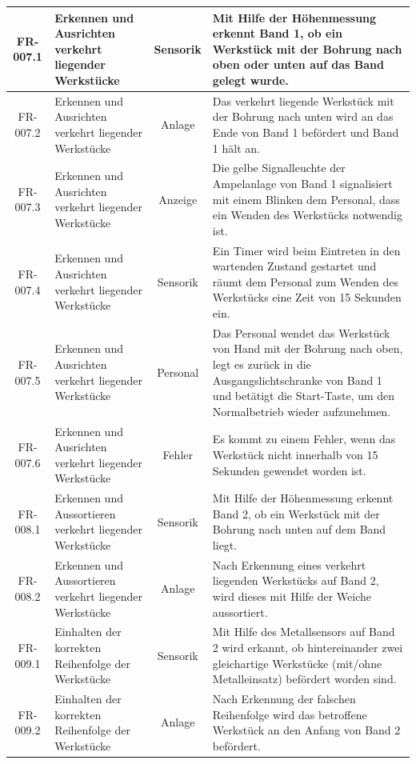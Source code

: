 \documentclass[oneside,a4paper,titlepage]{scrartcl}              %
\begin{document}
\begin{small}
\begin{center}
\begin{longtable}{|c|p{4cm}|c|p{7cm}|}
      \hline
      FR-007.1 & Erkennen und Ausrichten verkehrt liegender Werkstücke & Sensorik & Mit Hilfe der Höhenmessung erkennt Band 1, ob ein Werkstück mit der Bohrung nach oben oder unten auf das Band gelegt wurde.\\
      \hline
      FR-007.2 & Erkennen und Ausrichten verkehrt liegender Werkstücke & Anlage & Das verkehrt liegende Werkstück mit der Bohrung nach unten wird an das Ende von Band 1 befördert und Band 1 hält an.\\
      \hline
      FR-007.3 & Erkennen und Ausrichten verkehrt liegender Werkstücke & Anzeige & Die gelbe Signalleuchte der Ampelanlage von Band 1 signalisiert mit einem Blinken dem Personal, dass ein Wenden des Werkstücks notwendig ist.\\
      \hline
      FR-007.4 & Erkennen und Ausrichten verkehrt liegender Werkstücke & Sensorik & Ein Timer wird beim Eintreten in den wartenden Zustand gestartet und räumt dem Personal zum Wenden des Werkstücks eine Zeit von 15 Sekunden ein.\\
      \hline
      FR-007.5 & Erkennen und Ausrichten verkehrt liegender Werkstücke & Personal & Das Personal wendet das Werkstück von Hand mit der Bohrung nach oben, legt es zurück in die Ausgangslichtschranke von Band 1 und betätigt die Start-Taste, um den Normalbetrieb wieder aufzunehmen.\\
      \hline
      FR-007.6 & Erkennen und Ausrichten verkehrt liegender Werkstücke & Fehler & Es kommt zu einem Fehler, wenn das Werkstück nicht innerhalb von 15 Sekunden gewendet worden ist.\\
      \hline
      \rowcolor{lightgray} FR-008.1 & Erkennen und Aussortieren verkehrt liegender Werkstücke & Sensorik & Mit Hilfe der Höhenmessung erkennt Band 2, ob ein Werkstück mit der Bohrung nach unten auf dem Band liegt.\\
      \hline
      \rowcolor{lightgray} FR-008.2 & Erkennen und Aussortieren verkehrt liegender Werkstücke & Anlage & Nach Erkennung eines verkehrt liegenden Werkstücks auf Band 2, wird dieses mit Hilfe der Weiche aussortiert.\\
      \hline
      FR-009.1 & Einhalten der korrekten Reihenfolge der Werkstücke & Sensorik & Mit Hilfe des Metallsensors auf Band 2 wird erkannt, ob hintereinander zwei gleichartige Werkstücke (mit/ohne Metalleinsatz) befördert worden sind.\\
      \hline
      FR-009.2 & Einhalten der korrekten Reihenfolge der Werkstücke & Anlage & Nach Erkennung der falschen Reihenfolge wird das betroffene Werkstück an den Anfang von Band 2 befördert.\\

\end{longtable}
\end{center}
\end{small}
\end{document}
